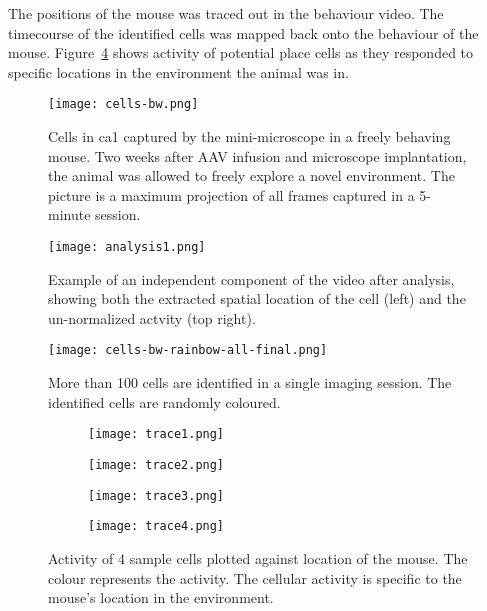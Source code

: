 The positions of the mouse was traced out in the behaviour video. The timecourse of the identified cells was mapped back onto the behaviour of the mouse. Figure~\ref{f.traceplot} shows  activity of potential place cells as they responded to specific locations in the environment the animal was in.
\begin{figure}[h]
    \texttt{[image: cells-bw.png]}
    \caption[Image of \Gls{ca1} neurons in a freely behaving mouse.]{Cells in \gls{ca1} captured by the mini-microscope in a freely behaving mouse. Two weeks after AAV infusion and microscope implantation, the animal was allowed to freely explore a novel environment. The picture is a maximum projection of all frames captured in a 5-minute session. \label{f.ca1bw}}
\end{figure}

\begin{figure}[h]
    \texttt{[image: analysis1.png]}
    \caption[Sample analysis data from a calcium imaging video.]{Example of an independent component of the video after analysis, showing both the extracted spatial location of the cell (left) and the un-normalized actvity (top right). \label{f.analysis}}
\end{figure}


\begin{figure}[h]
    \texttt{[image: cells-bw-rainbow-all-final.png]}
    \caption[Cells identified in a single imaging session.]{More than 100 cells are identified in a single imaging session. The identified cells are randomly coloured. \label{f.ca1rainbow}}
\end{figure}


\begin{figure}[h]
    \begin{subfigure}[t]{.5\linewidth}
        \texttt{[image: trace1.png]}
    \end{subfigure}
    \begin{subfigure}[t]{.5\linewidth}
        \texttt{[image: trace2.png]}
    \end{subfigure}
    \begin{subfigure}[t]{.5\linewidth}
        \texttt{[image: trace3.png]}
    \end{subfigure}
    \begin{subfigure}[t]{.5\linewidth}
        \texttt{[image: trace4.png]}
    \end{subfigure}
    \caption[Detection of potential place cells in \gls{ca1} calcium imaging.]{Activity of 4 sample cells plotted against location of the mouse. The colour represents the  activity. The cellular activity is specific to the mouse's location in the environment. \label{f.traceplot}}
\end{figure}

